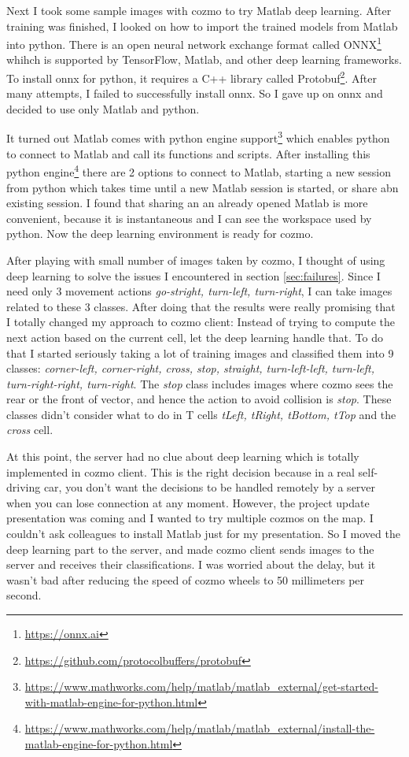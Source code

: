 \documentclass[12pt,a4paper]{article}
\begin{document}
Next I took some sample images with cozmo to try Matlab deep learning. After training was finished, I looked on how to import the trained models from Matlab into python. There is an open neural network exchange format called ONNX\footnote{\url{https://onnx.ai}} whihch is supported by TensorFlow, Matlab, and other deep learning frameworks. To install onnx for python, it requires a C++ library called Protobuf\footnote{\url{https://github.com/protocolbuffers/protobuf}}. After many attempts, I failed to successfully install onnx. So
I gave up on onnx and decided to use only Matlab and python. 

It turned out Matlab comes with python engine support\footnote{\url{https://www.mathworks.com/help/matlab/matlab_external/get-started-with-matlab-engine-for-python.html}} which enables python to connect to Matlab and call its functions and scripts. After installing this python engine\footnote{\url{https://www.mathworks.com/help/matlab/matlab_external/install-the-matlab-engine-for-python.html}} there are 2 options to connect to Matlab, starting a new session from python which takes time until a new Matlab session is started, or share abn existing session. I found that sharing an an already opened Matlab is more convenient, because it is instantaneous and I can see the workspace used by python. Now the deep learning environment is ready for cozmo.  

After playing with small number of images taken by cozmo, I thought of using deep learning to solve the issues I encountered in section \ref{sec:failures}. Since I need only 3 movement actions \textit{go-stright, turn-left, turn-right}, I can take images related to these 3 classes. After doing that the results were really promising that I totally changed my approach to cozmo client: Instead of trying to compute the next action based on the current cell, let the deep learning handle that. To do that I started seriously taking a lot of training images and classified them into 9 classes: 
\textit{corner-left,
corner-right,
cross,
stop,
straight,
turn-left-left,
turn-left,
turn-right-right,
turn-right}. The \textit{stop} class includes images where cozmo sees the rear or the front of vector, and hence the action to avoid collision is \textit{stop}. These classes didn't consider what to do in T cells \textit{tLeft, tRight, tBottom, tTop} and the \textit{cross} cell. 

At this point, the server had no clue about deep learning which is totally implemented in cozmo client. This is the right decision because in a real self-driving car, you don't want the decisions to be handled remotely by a server when you can lose connection at any moment. However, the project update presentation was coming and I wanted to try multiple cozmos on the map. I couldn't ask colleagues to install Matlab just for my presentation. So I moved the deep learning part to the server, and made cozmo client sends images to the server and receives their classifications. I was worried about the delay, but it wasn't bad after reducing the speed of cozmo wheels to 50 millimeters per second.  
 
\end{document}
